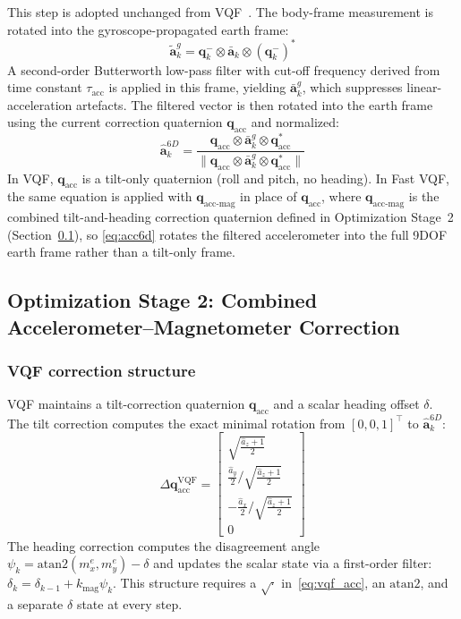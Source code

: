 \documentclass[conference]{IEEEtran}
\begin{document}
This step is adopted unchanged from VQF~\cite{laidig2023vqf}. The body-frame measurement is rotated into the gyroscope-propagated earth frame:
\begin{equation}
    \tilde{\mathbf{a}}_k^g = \mathbf{q}_k^- \otimes \bar{\mathbf{a}}_k \otimes (\mathbf{q}_k^-)^*
    \label{eq:acc_rotate}
\end{equation}
A second-order Butterworth low-pass filter with cut-off frequency derived from time constant $\tau_\text{acc}$ is applied in this frame, yielding $\bar{\mathbf{a}}_k^g$, which suppresses linear-acceleration artefacts. The filtered vector is then rotated into the earth frame using the current correction quaternion $\mathbf{q}_\text{acc}$ and normalized:
\begin{equation}
    \hat{\mathbf{a}}_k^{6D} = \frac{\mathbf{q}_\text{acc} \otimes \bar{\mathbf{a}}_k^g \otimes \mathbf{q}_\text{acc}^*}
                                   {\|\mathbf{q}_\text{acc} \otimes \bar{\mathbf{a}}_k^g \otimes \mathbf{q}_\text{acc}^*\|}
    \label{eq:acc6d}
\end{equation}
In VQF, $\mathbf{q}_\text{acc}$ is a tilt-only quaternion (roll and pitch, no heading). In Fast VQF, the same equation is applied with $\mathbf{q}_\text{acc-mag}$ in place of $\mathbf{q}_\text{acc}$, where $\mathbf{q}_\text{acc-mag}$ is the combined tilt-and-heading correction quaternion defined in Optimization Stage~2 (Section~\ref{sec:stage2}), so \eqref{eq:acc6d} rotates the filtered accelerometer into the full 9DOF earth frame rather than a tilt-only frame.

\subsection{Optimization Stage 2: Combined Accelerometer--Magnetometer Correction}
\label{sec:stage2}

\subsubsection*{VQF correction structure}

VQF maintains a tilt-correction quaternion $\mathbf{q}_\text{acc}$ and a scalar heading offset $\delta$. The tilt correction computes the exact minimal rotation from $[0,0,1]^\top$ to $\hat{\mathbf{a}}_k^{6D}$:
\begin{equation}
    \Delta\mathbf{q}_\text{acc}^\text{VQF} =
    \begin{bmatrix}
        \sqrt{\tfrac{\hat{a}_z+1}{2}} \\[2pt]
        \tfrac{\hat{a}_y}{2}\Big/\sqrt{\tfrac{\hat{a}_z+1}{2}} \\[2pt]
        -\tfrac{\hat{a}_x}{2}\Big/\sqrt{\tfrac{\hat{a}_z+1}{2}} \\[2pt]
        0
    \end{bmatrix}
    \label{eq:vqf_acc}
\end{equation}
The heading correction computes the disagreement angle $\psi_k = \mathrm{atan2}(m_x^e, m_y^e) - \delta$ and updates the scalar state via a first-order filter: $\delta_k = \delta_{k-1} + k_\text{mag}\psi_k$. This structure requires a $\sqrt{\cdot}$ in~\eqref{eq:vqf_acc}, an $\mathrm{atan2}$, and a separate $\delta$ state at every step.
\end{document}
